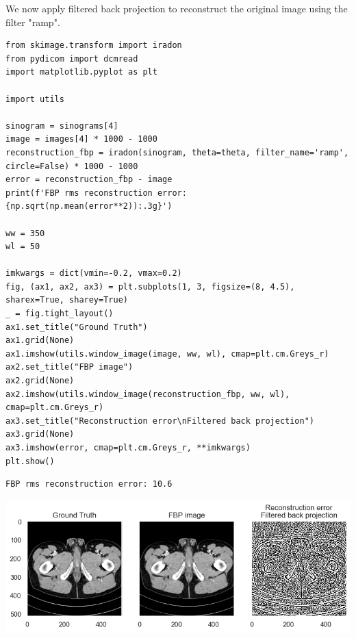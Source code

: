 \documentclass[a4paper, 11pt]{article}
\begin{document}
We now apply filtered back projection to reconstruct the original image using the filter "ramp".
\begin{verbatim}
from skimage.transform import iradon
from pydicom import dcmread
import matplotlib.pyplot as plt

import utils

sinogram = sinograms[4]
image = images[4] * 1000 - 1000
reconstruction_fbp = iradon(sinogram, theta=theta, filter_name='ramp', circle=False) * 1000 - 1000
error = reconstruction_fbp - image
print(f'FBP rms reconstruction error: {np.sqrt(np.mean(error**2)):.3g}')

ww = 350
wl = 50

imkwargs = dict(vmin=-0.2, vmax=0.2)
fig, (ax1, ax2, ax3) = plt.subplots(1, 3, figsize=(8, 4.5), sharex=True, sharey=True)
_ = fig.tight_layout()
ax1.set_title("Ground Truth")
ax1.grid(None)
ax1.imshow(utils.window_image(image, ww, wl), cmap=plt.cm.Greys_r)
ax2.set_title("FBP image")
ax2.grid(None)
ax2.imshow(utils.window_image(reconstruction_fbp, ww, wl), cmap=plt.cm.Greys_r)
ax3.set_title("Reconstruction error\nFiltered back projection")
ax3.grid(None)
ax3.imshow(error, cmap=plt.cm.Greys_r, **imkwargs)
plt.show()
\end{verbatim}

\begin{verbatim}
FBP rms reconstruction error: 10.6
\end{verbatim}

\begin{center}
\includegraphics[width=.9\linewidth]{./.ob-jupyter/bf8b320469e40ad55860556539c903c1f6c6ffe0.png}
\end{center}
\end{document}
